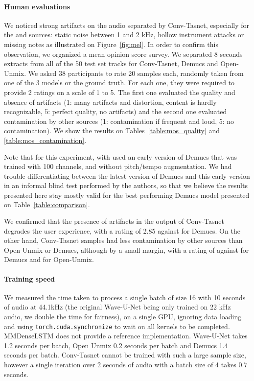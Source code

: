 \paragraph{Human evaluations}

We noticed strong artifacts on the audio separated by Conv-Tasnet, especially for the  and  sources: static noise between 1 and 2 kHz, 
hollow instrument attacks or missing notes as illustrated on Figure~\ref{fig:mel}. In order to confirm this observation, we organized a mean opinion score survey. 
We separated 8 seconds extracts from all of the 50 test set tracks for Conv-Tasnet, Demucs and Open-Unmix. We asked 38 participants to rate 20 samples each, randomly taken from one
of the 3 models or the ground truth. For each one, they were required to provide 2 ratings on a scale of 1 to 5. The first one evaluated the quality and absence of artifacts (1: many artifacts and distortion, content is hardly recognizable, 5: perfect quality, no artifacts) and the second one evaluated contamination by other sources (1: contamination if frequent and loud, 5: no contamination). We show the results on Tables~\ref{table:mos_quality} and \ref{table:mos_contamination}.

Note that for this experiment, with used an early version of Demucs that was trained with 100 channels, and without pitch/tempo augmentation. We had trouble differentiating between the latest version of Demucs and this early version in an informal blind test performed by the authors, so that we believe the results presented here stay mostly valid for the best performing Demucs model presented on Table~\ref{table:comparison}.

We confirmed that the presence of artifacts in the output of Conv-Tasnet degrades the user experience, with a rating of 2.85 against  for Demucs.
On the other hand, Conv-Tasnet samples had less contamination by other sources than Open-Unmix or Demucs, although by a small margin, with a rating of 
against  for Demucs and  for Open-Unmix.

\paragraph{Training speed} We measured the time taken to process a single batch of size 16 with 10 seconds of audio at 44.1kHz (the original Wave-U-Net being only trained on 22 kHz audio, we double the time for fairness), on a single GPU, ignoring data loading and using \verb|torch.cuda.synchronize|
to wait on all kernels to be completed. MMDenseLSTM does not provide a reference implementation. Wave-U-Net takes 1.2 seconds per batch, Open Unmix 0.2 seconds per batch
and Demucs 1.4 seconds per batch. Conv-Tasnet cannot be trained with such a large sample size, however a single iteration over 2 seconds of audio with a batch size of 4
takes 0.7 seconds.


